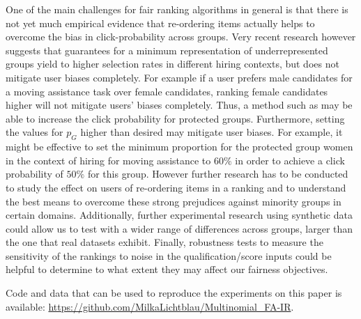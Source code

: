 One of the main challenges for fair ranking algorithms in general is that there is not yet much empirical evidence that re-ordering items actually helps to overcome the bias in click-probability across groups.
%
Very recent research however \cite{suhr2020does} suggests that guarantees for a minimum representation of underrepresented groups yield to higher selection rates in different hiring contexts, but does not mitigate user biases completely. For example if a user prefers male candidates for a moving assistance task over female candidates, ranking female candidates higher will not mitigate users' biases completely.
%
Thus, a method such as \algoFAIR may be able to increase the click probability for protected groups. Furthermore, setting the values for $p_G$ higher than desired may mitigate user biases. For example, it might be effective to set the minimum proportion for the protected group women in the context of hiring for moving assistance to $60\%$ in order to achieve a click probability of $50\%$ for this group.
%
However further research has to be conducted to study the effect on users of re-ordering items in a ranking and to understand the best means to overcome these strong prejudices against minority groups in certain domains.
%
Additionally, further experimental research using synthetic data could allow us to test with a wider range of differences across groups, larger than the one that real datasets exhibit.
%
Finally, robustness tests to measure the sensitivity of the rankings to noise in the qualification/score inputs could be helpful to determine to what extent they may affect our fairness objectives.

Code and data that can be used to reproduce the experiments on this paper is available: \url{https://github.com/MilkaLichtblau/Multinomial_FA-IR}.
